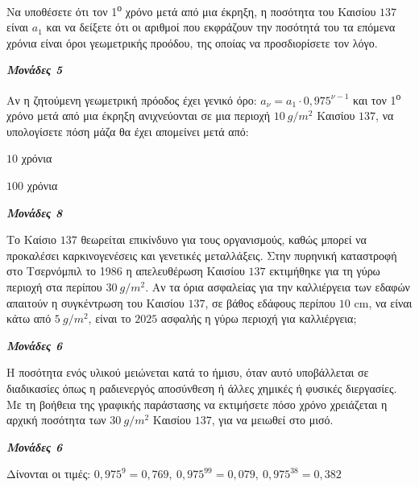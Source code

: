 \documentclass[11pt,a4paper,twoside]{book}
\newcommand{\monades}[1]{
\hspace*{\fill}
\textbf{\textit{\textcolor{maincolor}{Μονάδες #1}}}}
\begin{document}
\begin{alist}
\item Να υποθέσετε ότι τον 1\textsuperscript{ο} χρόνο μετά από μια έκρηξη, η ποσότητα του Καισίου $137$ είναι $a_1$ και να δείξετε ότι οι αριθμοί που εκφράζουν την ποσότητά του τα επόμενα χρόνια είναι όροι γεωμετρικής προόδου, της οποίας να προσδιορίσετε τον λόγο.
\monades{5}
\item Αν η ζητούμενη γεωμετρική πρόοδος έχει γενικό όρο: $a_{\nu} = a_1 \cdot 0{,}975^{\nu - 1}$ και τον 1\textsuperscript{ο} χρόνο μετά από μια έκρηξη ανιχνεύονται σε μια περιοχή $10\ g/m^{2}$ Καισίου $137$, να υπολογίσετε πόση μάζα θα έχει απομείνει μετά από:

\begin{rlist}
\item $10$ χρόνια

\item $100$ χρόνια
\monades{8}
\end{rlist}
\item

\begin{rlist}
\item Το Καίσιο $137$ θεωρείται επικίνδυνο για τους οργανισμούς, καθώς μπορεί να προκαλέσει καρκινογενέσεις και γενετικές μεταλλάξεις. Στην πυρηνική καταστροφή στο Τσερνόμπιλ το 1986 η απελευθέρωση Καισίου $137$ εκτιμήθηκε για τη γύρω περιοχή στα περίπου $30\ g/m^{2}$. Αν τα όρια ασφαλείας για την καλλιέργεια των εδαφών απαιτούν η συγκέντρωση του Καισίου $137$, σε βάθος εδάφους περίπου $10$ cm, να είναι κάτω από $5\ g/m^{2}$, είναι το $2025$ ασφαλής η γύρω περιοχή για καλλιέργεια;
\monades{6}
\item Η ποσότητα ενός υλικού μειώνεται κατά το ήμισυ, όταν αυτό υποβάλλεται σε διαδικασίες όπως η ραδιενεργός αποσύνθεση ή άλλες χημικές ή φυσικές διεργασίες. Με τη βοήθεια της γραφικής παράστασης να εκτιμήσετε πόσο χρόνο χρειάζεται η αρχική ποσότητα των $30\ g/m^{2}$ Καισίου $137$, για να μειωθεί στο μισό.

\begin{marginfigure}

\end{marginfigure}
\monades{6}

Δίνονται οι τιμές:
$0{,}975^{9} = 0{,}769,\ 0{,}975^{99} = 0{,}079,\ 0{,}975^{38} = 0{,}382$
\end{rlist}
\end{alist}
\end{document}
